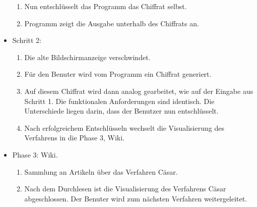 \documentclass{article}
\begin{document}
\begin{itemize}[label={}]
\begin{enumerate}
  \item Nun entschlüsselt das Programm das Chiffrat selbst.
  \item Programm zeigt die Ausgabe unterhalb des Chiffrats an.
 \end{enumerate}
 \item Schritt 2:
 \begin{enumerate}
  \item Die alte Bildschirmanzeige verschwindet.
  \item Für den Benuter wird vom Programm ein Chiffrat generiert. 
  \item[] Auf diesem Chiffrat wird dann analog gearbeitet, wie auf der Eingabe aus Schritt 1. Die funktionalen Anforderungen sind identisch. Die Unterschiede liegen darin, dass der Benutzer nun entschlüsselt.
  \item Nach erfolgreichem Entschlüsseln wechselt die Visualisierung des Verfahrens in die Phase 3, Wiki.
 \end{enumerate}
 \item Phase 3: Wiki.
  \begin{enumerate}
   \item Sammlung an Artikeln über das Verfahren Cäsar.
   \item Nach dem Durchlesen ist die Visualisierung des Verfahrens Cäsar abgeschlossen. Der Benuter wird zum nächsten Verfahren weitergeleitet.
  \end{enumerate}
\end{itemize}
\end{document}

